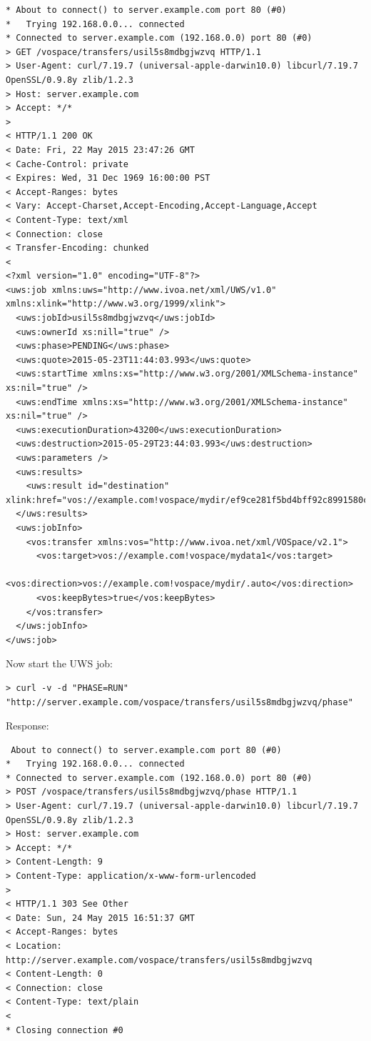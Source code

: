 \documentclass[11pt,a4paper]{ivoa}
\begin{document}
\begin{lstlisting}
* About to connect() to server.example.com port 80 (#0)
*   Trying 192.168.0.0... connected
* Connected to server.example.com (192.168.0.0) port 80 (#0)
> GET /vospace/transfers/usil5s8mdbgjwzvq HTTP/1.1
> User-Agent: curl/7.19.7 (universal-apple-darwin10.0) libcurl/7.19.7 OpenSSL/0.9.8y zlib/1.2.3
> Host: server.example.com
> Accept: */*
>
< HTTP/1.1 200 OK
< Date: Fri, 22 May 2015 23:47:26 GMT
< Cache-Control: private
< Expires: Wed, 31 Dec 1969 16:00:00 PST
< Accept-Ranges: bytes
< Vary: Accept-Charset,Accept-Encoding,Accept-Language,Accept
< Content-Type: text/xml
< Connection: close
< Transfer-Encoding: chunked
<
<?xml version="1.0" encoding="UTF-8"?>
<uws:job xmlns:uws="http://www.ivoa.net/xml/UWS/v1.0" xmlns:xlink="http://www.w3.org/1999/xlink">
  <uws:jobId>usil5s8mdbgjwzvq</uws:jobId>
  <uws:ownerId xs:nill="true" />
  <uws:phase>PENDING</uws:phase>
  <uws:quote>2015-05-23T11:44:03.993</uws:quote>
  <uws:startTime xmlns:xs="http://www.w3.org/2001/XMLSchema-instance" xs:nil="true" />
  <uws:endTime xmlns:xs="http://www.w3.org/2001/XMLSchema-instance" xs:nil="true" />
  <uws:executionDuration>43200</uws:executionDuration>
  <uws:destruction>2015-05-29T23:44:03.993</uws:destruction>
  <uws:parameters />
  <uws:results>
    <uws:result id="destination" xlink:href="vos://example.com!vospace/mydir/ef9ce281f5bd4bff92c8991580cddff4"/>
  </uws:results>
  <uws:jobInfo>
    <vos:transfer xmlns:vos="http://www.ivoa.net/xml/VOSpace/v2.1">
      <vos:target>vos://example.com!vospace/mydata1</vos:target>
      <vos:direction>vos://example.com!vospace/mydir/.auto</vos:direction>
      <vos:keepBytes>true</vos:keepBytes>
    </vos:transfer>
  </uws:jobInfo>
</uws:job>
\end{lstlisting}
Now start the UWS job:
\begin{lstlisting}
> curl -v -d "PHASE=RUN" "http://server.example.com/vospace/transfers/usil5s8mdbgjwzvq/phase"
\end{lstlisting}
Response:
\begin{lstlisting}
 About to connect() to server.example.com port 80 (#0)
*   Trying 192.168.0.0... connected
* Connected to server.example.com (192.168.0.0) port 80 (#0)
> POST /vospace/transfers/usil5s8mdbgjwzvq/phase HTTP/1.1
> User-Agent: curl/7.19.7 (universal-apple-darwin10.0) libcurl/7.19.7 OpenSSL/0.9.8y zlib/1.2.3
> Host: server.example.com
> Accept: */*
> Content-Length: 9
> Content-Type: application/x-www-form-urlencoded
>
< HTTP/1.1 303 See Other
< Date: Sun, 24 May 2015 16:51:37 GMT
< Accept-Ranges: bytes
< Location: http://server.example.com/vospace/transfers/usil5s8mdbgjwzvq
< Content-Length: 0
< Connection: close
< Content-Type: text/plain
<
* Closing connection #0
\end{lstlisting}
\end{document}
